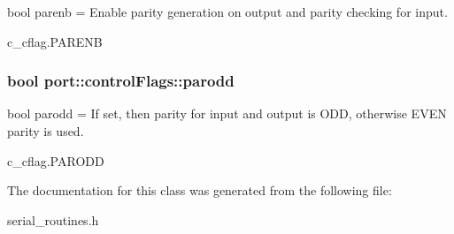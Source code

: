 bool parenb = Enable parity generation on output and parity checking for input. 

c\+\_\+cflag.\+P\+A\+R\+E\+NB
\subsubsection[{\texorpdfstring{parodd}{parodd}}]{\setlength{\rightskip}{0pt plus 5cm}bool port\+::control\+Flags\+::parodd}\hypertarget{classport_1_1controlFlags_a82805f8b5e019f8d7bb104aac8bf3285}{}\label{classport_1_1controlFlags_a82805f8b5e019f8d7bb104aac8bf3285}


bool parodd = If set, then parity for input and output is O\+DD, otherwise E\+V\+EN parity is used. 

c\+\_\+cflag.\+P\+A\+R\+O\+DD

The documentation for this class was generated from the following file\+:\begin{DoxyCompactItemize}
\item 
serial\+\_\+routines.\+h\end{DoxyCompactItemize}
